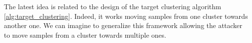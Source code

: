 The latest idea is related to the design of the target clustering algorithm \ref{alg:target_clustering}. Indeed, it works moving samples from one cluster towards another one. We can imagine to generalize this framework allowing the attacker to move samples from a cluster towards multiple ones.\\
